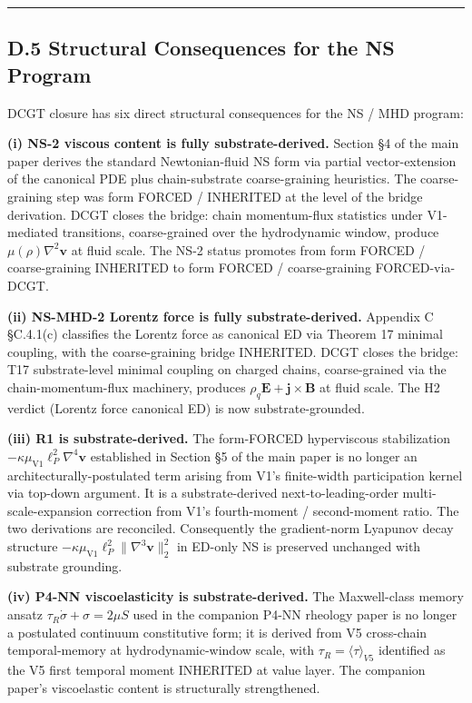 \documentclass[
  11pt,a4paper]{article}
\begin{document}
\begin{center}\rule{0.5\linewidth}{0.5pt}\end{center}

\subsection{D.5 Structural Consequences for the NS
Program}\label{d.5-structural-consequences-for-the-ns-program}

DCGT closure has six direct structural consequences for the NS / MHD
program:

\textbf{(i) NS-2 viscous content is fully substrate-derived.} Section §4
of the main paper derives the standard Newtonian-fluid NS form via
partial vector-extension of the canonical PDE plus chain-substrate
coarse-graining heuristics. The coarse-graining step was form FORCED /
INHERITED at the level of the bridge derivation. DCGT closes the bridge:
chain momentum-flux statistics under V1-mediated transitions,
coarse-grained over the hydrodynamic window, produce
\(\mu(\rho)\nabla^2\mathbf{v}\) at fluid scale. The NS-2 status promotes
from form FORCED / coarse-graining INHERITED to form FORCED /
coarse-graining FORCED-via-DCGT.

\textbf{(ii) NS-MHD-2 Lorentz force is fully substrate-derived.}
Appendix C §C.4.1(c) classifies the Lorentz force as canonical ED via
Theorem 17 minimal coupling, with the coarse-graining bridge INHERITED.
DCGT closes the bridge: T17 substrate-level minimal coupling on charged
chains, coarse-grained via the chain-momentum-flux machinery, produces
\(\rho_q\mathbf{E} + \mathbf{j}\times\mathbf{B}\) at fluid scale. The H2
verdict (Lorentz force canonical ED) is now substrate-grounded.

\textbf{(iii) R1 is substrate-derived.} The form-FORCED hyperviscous
stabilization \(-\kappa\mu_\mathrm{V1}\ell_P^2\nabla^4\mathbf{v}\)
established in Section §5 of the main paper is no longer an
architecturally-postulated term arising from V1's finite-width
participation kernel via top-down argument. It is a substrate-derived
next-to-leading-order multi-scale-expansion correction from V1's
fourth-moment / second-moment ratio. The two derivations are reconciled.
Consequently the gradient-norm Lyapunov decay structure
\(-\kappa\mu_\mathrm{V1}\ell_P^2\|\nabla^3\mathbf{v}\|_2^2\) in ED-only
NS is preserved unchanged with substrate grounding.

\textbf{(iv) P4-NN viscoelasticity is substrate-derived.} The
Maxwell-class memory ansatz \(\tau_R\dot\sigma + \sigma = 2\mu S\) used
in the companion P4-NN rheology paper is no longer a postulated
continuum constitutive form; it is derived from V5 cross-chain
temporal-memory at hydrodynamic-window scale, with
\(\tau_R = \bigl\langle\tau\bigr\rangle_{V5}\) identified as the V5
first temporal moment INHERITED at value layer. The companion paper's
viscoelastic content is structurally strengthened.
\end{document}
